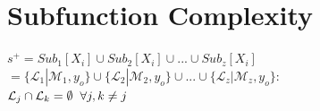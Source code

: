\documentclass[11pt]{article}
\begin{document}
\section{Subfunction Complexity}
\begin{center}
$
s^+ = Sub_1[X_i] \cup Sub_2[X_i] \cup ... \cup Sub_z[X_i]
$
\\ \vspace{3mm}
$
= \{ \mathcal{L}_1| \mathcal{M}_1,y_o\} \cup \{  \mathcal{L}_2| \mathcal{M}_2,y_o\} \cup ... \cup \{  \mathcal{L}_z| \mathcal{M}_z,y_o\} : 
$
\\ \vspace{3mm}
$
\mathcal{L}_j \cap \mathcal{L}_k = \emptyset \hspace{2mm} \forall j,k\neq j
$
\end{center}
\end{document}

